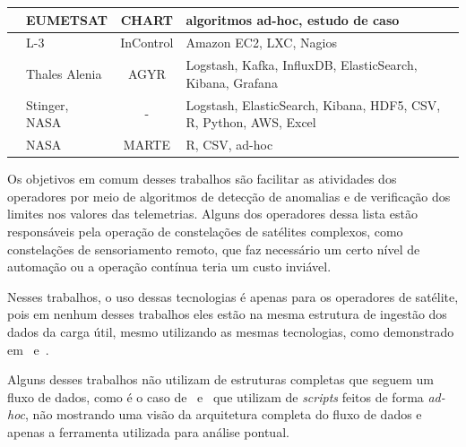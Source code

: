 \begin{table}[htbp]
\begin{center}
\begin{tabular}{|C{8em}|C{6em}|c|C{10em}|}
      \hline
      \cite{trollopeAnalysisAutomatedTechniques2018} & EUMETSAT           & CHART                & algoritmos ad-hoc, estudo de caso                                                    \\
      \hline
      \cite{gillesFlyingLargeConstellations2016}     & L-3                & InControl            & Amazon EC2, LXC, Nagios                                                              \\
      \hline
      \cite{hennionBigdataSatelliteYearly2018}       & Thales Alenia      & AGYR                 & Logstash, Kafka, InfluxDB, ElasticSearch, Kibana, Grafana                            \\
      \hline
      \cite{mateikUsingBigData2017}                  & Stinger, NASA      & -                    & Logstash, ElasticSearch, Kibana, HDF5, CSV, R, Python, AWS, Excel                    \\
      \hline
      \cite{fernandezTelemetryAnomalyDetection2017}  & NASA               & MARTE                & R, CSV, ad-hoc                                                                       \\
      \hline
    \end{tabular}
  \end{center}
\end{table}

Os objetivos em comum desses trabalhos são facilitar as atividades dos operadores por meio de algoritmos de detecção de anomalias e de verificação dos limites nos valores das telemetrias.
Alguns dos operadores dessa lista estão responsáveis pela operação de constelações de satélites complexos, como constelações de sensoriamento remoto, que faz necessário um certo nível de automação ou a operação contínua teria um custo inviável.

Nesses trabalhos, o uso dessas tecnologias é apenas para os operadores de satélite, pois em nenhum desses trabalhos eles estão na mesma estrutura de ingestão dos dados da carga útil, mesmo utilizando as mesmas tecnologias, como demonstrado em~\cite{mateikUsingBigData2017} e~\cite{adamskiDataAnalyticsLarge2016}.

Alguns desses trabalhos não utilizam de estruturas completas que seguem um fluxo de dados, como é o caso de~\cite{fernandezTelemetryAnomalyDetection2017} e~\cite{trollopeAnalysisAutomatedTechniques2018} que utilizam de \textit{scripts} feitos de forma \textit{ad-hoc}, não mostrando uma visão da arquitetura completa do fluxo de dados e apenas a ferramenta utilizada para análise pontual.


